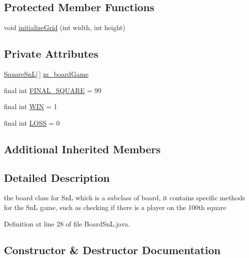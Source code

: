 \subsection*{Protected Member Functions}
\begin{DoxyCompactItemize}
\item 
void \hyperlink{class_board_1_1_board_sn_l_a934454d70accef26911914261147d8f5}{initialize\+Grid} (int width, int height)
\end{DoxyCompactItemize}
\subsection*{Private Attributes}
\begin{DoxyCompactItemize}
\item 
\hyperlink{class_square_1_1_square_sn_l}{Square\+Sn\+L}\mbox{[}$\,$\mbox{]} \hyperlink{class_board_1_1_board_sn_l_a98423adeb63e796de2d496689b4ce8e1}{m\+\_\+board\+Game}
\item 
final int \hyperlink{class_board_1_1_board_sn_l_a133b0d6726fc954ea12a66b4369e3fa6}{F\+I\+N\+A\+L\+\_\+\+S\+Q\+U\+A\+R\+E} = 99
\item 
final int \hyperlink{class_board_1_1_board_sn_l_a9f3b27889e40b337a28438224a5fab4b}{W\+I\+N} = 1
\item 
final int \hyperlink{class_board_1_1_board_sn_l_aa6138411eddcd92ae999cff9fc34acb7}{L\+O\+S\+S} = 0
\end{DoxyCompactItemize}
\subsection*{Additional Inherited Members}


\subsection{Detailed Description}
the board class for Sn\+L which is a subclass of board, it contains specific methods for the Sn\+L game, such as checking if there is a player on the 100th square 

Definition at line 28 of file Board\+Sn\+L.\+java.



\subsection{Constructor \& Destructor Documentation}
\hypertarget{class_board_1_1_board_sn_l_a03f7b8911496b68ad4de0d1b0939220a}{}
